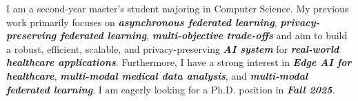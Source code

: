 

\begin{cvparagraph}


I am a second-year master's student majoring in Computer Science.
My previous work primarily focuses on \textit{\textbf{asynchronous federated learning}}, \textit{\textbf{privacy-preserving federated learning}}, \textit{\textbf{multi-objective trade-offs}}
and aim to build a robust, efficient, scalable, and privacy-preserving \textit{\textbf{AI system}} for \textit{\textbf{real-world healthcare applications}}.
Furthermore, I have a strong interest in \textit{\textbf{Edge AI for healthcare}}, \textit{\textbf{multi-modal medical data analysis}}, and \textit{\textbf{multi-modal federated learning}}.
I am eagerly looking for a Ph.D. position in \textit{\textbf{Fall 2025}}.


\end{cvparagraph}
